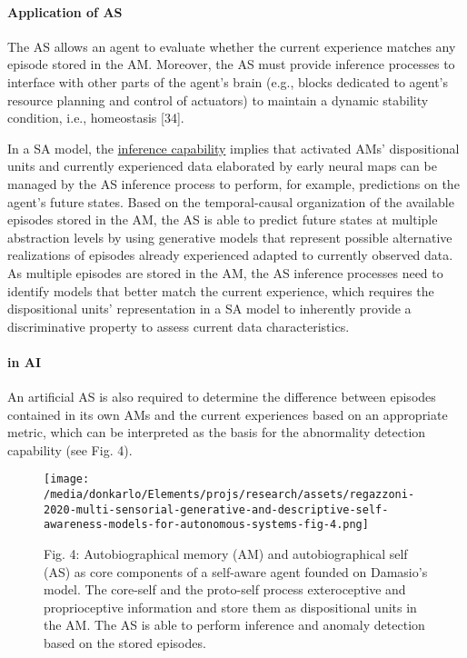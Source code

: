 \documentclass{article}
\begin{document}
			\paragraph{Application of AS}The AS allows an agent to evaluate whether the current experience matches any episode stored in the AM.  Moreover, the AS must provide inference processes to interface with other
			parts of the agent’s brain (e.g., blocks dedicated to agent’s
			resource planning and control of actuators) to maintain a
			dynamic stability condition, i.e., homeostasis \citet{regazzoni-2020-multi-sensorial-generative-and-descriptive-self-awareness-models-for-autonomous-systems}[34]. 
			
			In a SA model, the \underline{inference capability} implies that activated AMs’ dispositional units and currently experienced data elaborated by early neural maps can be managed by the AS inference
			process to perform, for example, predictions on the agent’s
			future states. Based on the temporal-causal organization of
			the available episodes stored in the AM, the AS is able to
			predict future states at multiple abstraction levels by using
			generative models that represent possible alternative realizations of episodes already experienced adapted to currently observed data. As multiple episodes are stored in the AM, the AS inference processes need to identify models that better match the current experience, which requires the dispositional units’ representation in a SA model to inherently provide a discriminative property to assess current data characteristics.
			
			
			\paragraph{in AI} An artificial AS is also required to determine the difference
			between episodes contained in its own AMs and the current
			experiences based on an appropriate metric, which can be interpreted as the basis for the abnormality detection capability
			(see Fig. 4). 
			\begin{figure*}
				\centering
				\texttt{[image: /media/donkarlo/Elements/projs/research/assets/regazzoni-2020-multi-sensorial-generative-and-descriptive-self-awareness-models-for-autonomous-systems-fig-4.png]}
				\caption{Fig. 4: Autobiographical memory (AM) and autobiographical
					self (AS) as core components of a self-aware agent founded
					on Damasio’s model. The core-self and the proto-self process
					exteroceptive and proprioceptive information and store them
					as dispositional units in the AM. The AS is able to perform
					inference and anomaly detection based on the stored episodes.
				}
				\label{fig:regazzoni-2020-multi-sensorial-generative-and-descriptive-self-awareness-models-for-autonomous-systems-fig-4.png}
			\end{figure*}
			
\end{document}

